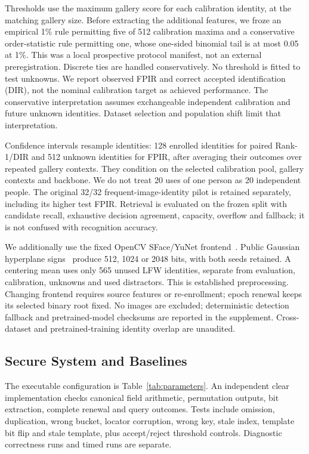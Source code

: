 \documentclass[journal]{IEEEtran}
\begin{document}
Thresholds use the maximum gallery score for each calibration identity, at the matching gallery size. Before extracting the additional features, we froze an empirical 1\% rule permitting five of 512 calibration maxima and a conservative order-statistic rule permitting one, whose one-sided binomial tail is at most 0.05 at 1\%. This was a local prospective protocol manifest, not an external preregistration. Discrete ties are handled conservatively. No threshold is fitted to test unknowns. We report observed FPIR and correct accepted identification (DIR), not the nominal calibration target as achieved performance. The conservative interpretation assumes exchangeable independent calibration and future unknown identities. Dataset selection and population shift limit that interpretation.

Confidence intervals resample identities: 128 enrolled identities for paired Rank-1/DIR and 512 unknown identities for FPIR, after averaging their outcomes over repeated gallery contexts. They condition on the selected calibration pool, gallery contexts and backbone. We do not treat 20 uses of one person as 20 independent people. The original 32/32 frequent-image-identity pilot is retained separately, including its higher test FPIR. Retrieval is evaluated on the frozen split with candidate recall, exhaustive decision agreement, capacity, overflow and fallback; it is not confused with recognition accuracy.

We additionally use the fixed OpenCV SFace/YuNet frontend~\cite{opencv2026zoo}. Public Gaussian hyperplane signs~\cite{charikar2002similarity} produce 512, 1024 or 2048 bits, with both seeds retained. A centering mean uses only 565 unused LFW identities, separate from evaluation, calibration, unknowns and used distractors. This is established preprocessing. Changing frontend requires source features or re-enrollment; epoch renewal keeps its selected binary root fixed. No images are excluded; deterministic detection fallback and pretrained-model checksums are reported in the supplement. Cross-dataset and pretrained-training identity overlap are unaudited.

\subsection{Secure System and Baselines}
The executable configuration is Table~\ref{tab:parameters}. An independent clear implementation checks canonical field arithmetic, permutation outputs, bit extraction, complete renewal and query outcomes. Tests include omission, duplication, wrong bucket, locator corruption, wrong key, stale index, template bit flip and stale template, plus accept/reject threshold controls. Diagnostic correctness runs and timed runs are separate.
\end{document}
